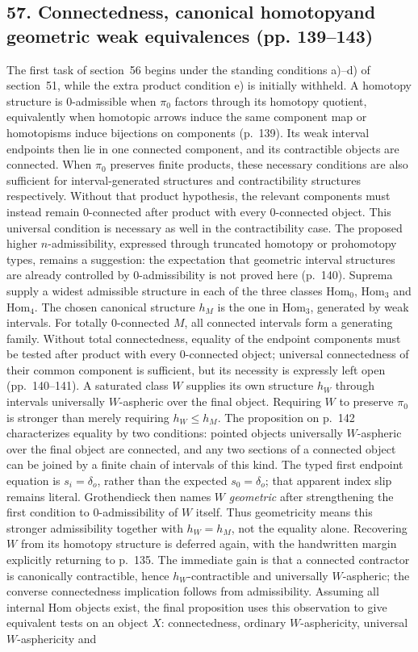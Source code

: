 \subsection*{57. Connectedness, canonical homotopy\newline and geometric weak equivalences (pp. 139--143)}
The first task of section~56 begins under the standing conditions a)--d) of section~51, while the extra product condition e) is initially withheld. A homotopy structure is $0$-admissible when $\pi_0$ factors through its homotopy quotient, equivalently when homotopic arrows induce the same component map or homotopisms induce bijections on components (p.~139). Its weak interval endpoints then lie in one connected component, and its contractible objects are connected. When $\pi_0$ preserves finite products, these necessary conditions are also sufficient for interval-generated structures and contractibility structures respectively. Without that product hypothesis, the relevant components must instead remain $0$-connected after product with every $0$-connected object. This universal condition is necessary as well in the contractibility case. The proposed higher $n$-admissibility, expressed through truncated homotopy or prohomotopy types, remains a suggestion: the expectation that geometric interval structures are already controlled by $0$-admissibility is not proved here (p.~140). Suprema supply a widest admissible structure in each of the three classes $\mathrm{Hom}_0$, $\mathrm{Hom}_3$ and $\mathrm{Hom}_4$. The chosen canonical structure $h_M$ is the one in $\mathrm{Hom}_3$, generated by weak intervals. For totally $0$-connected $M$, all connected intervals form a generating family. Without total connectedness, equality of the endpoint components must be tested after product with every $0$-connected object; universal connectedness of their common component is sufficient, but its necessity is expressly left open (pp.~140--141). A saturated class $W$ supplies its own structure $h_W$ through intervals universally $W$-aspheric over the final object. Requiring $W$ to preserve $\pi_0$ is stronger than merely requiring $h_W\leq h_M$. The proposition on p.~142 characterizes equality by two conditions: pointed objects universally $W$-aspheric over the final object are connected, and any two sections of a connected object can be joined by a finite chain of intervals of this kind. The typed first endpoint equation is $s_i=\delta_o$, rather than the expected $s_0=\delta_o$; that apparent index slip remains literal. Grothendieck then names $W$ \emph{geometric} after strengthening the first condition to $0$-admissibility of $W$ itself. Thus geometricity means this stronger admissibility together with $h_W=h_M$, not the equality alone. Recovering $W$ from its homotopy structure is deferred again, with the handwritten margin explicitly returning to p.~135. The immediate gain is that a connected contractor is canonically contractible, hence $h_W$-contractible and universally $W$-aspheric; the converse connectedness implication follows from admissibility. Assuming all internal Hom objects exist, the final proposition uses this observation to give equivalent tests on an object $X$: connectedness, ordinary $W$-asphericity, universal $W$-asphericity and 